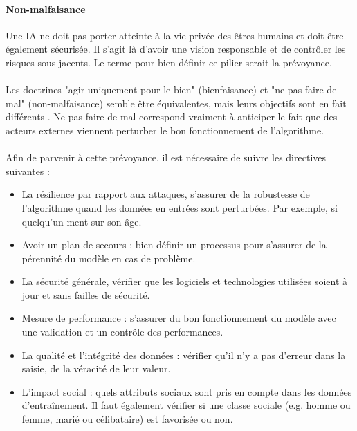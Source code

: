 \documentclass[10pt, french, a4paper]{article}
\begin{document}
\paragraph{Non-malfaisance}
Une IA ne doit pas porter atteinte à la vie privée des êtres humains et doit être également sécurisée. Il s'agit là d'avoir une vision responsable et de contrôler les risques sous-jacents. Le terme pour bien définir ce pilier serait la prévoyance.

\paragraph{}
Les doctrines "agir uniquement pour le bien" (bienfaisance) et "ne pas faire de mal" (non-malfaisance) semble être équivalentes, mais leurs objectifs sont en fait différents \citep{floridi_unified_2019}. Ne pas faire de mal correspond vraiment à anticiper le fait que des acteurs externes viennent perturber le bon fonctionnement de l'algorithme.

\paragraph{}
Afin de parvenir à cette prévoyance, il est nécessaire de suivre les directives suivantes :

\begin{itemize}
    \item La résilience par rapport aux attaques, s'assurer de la robustesse de l'algorithme quand les données en entrées sont perturbées. Par exemple, si quelqu'un ment sur son âge.
    \item Avoir un plan de secours : bien définir un processus pour s'assurer de la pérennité du modèle en cas de problème.
    \item La sécurité générale, vérifier que les logiciels et technologies utilisées soient à jour et sans failles de sécurité.
    \item Mesure de performance : s'assurer du bon fonctionnement du modèle avec une validation et un contrôle des performances.
    \item La qualité et l'intégrité des données : vérifier qu'il n'y a pas d'erreur dans la saisie, de la véracité de leur valeur.
    \item L'impact social : quels attributs sociaux sont pris en compte dans les données d'entraînement. Il faut également vérifier si une classe sociale (e.g. homme ou femme, marié ou célibataire) est favorisée ou non.     
\end{itemize}
\end{document}
